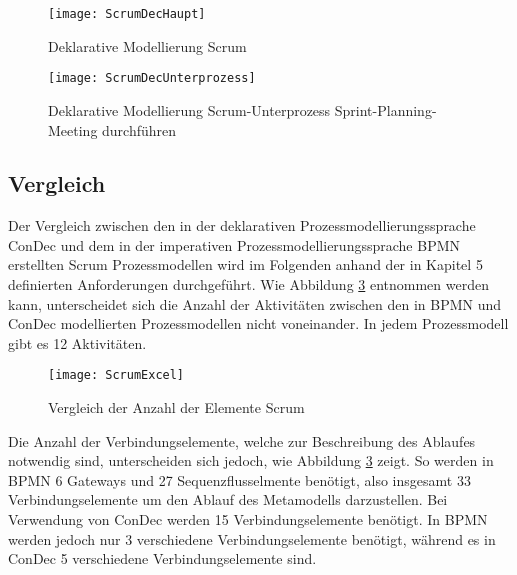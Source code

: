 \begin{figure}[htp]
\begin{center}
  \texttt{[image: ScrumDecHaupt]} %
  \caption{Deklarative Modellierung Scrum}
  \label{fig:ScrumDecHaupt}
\end{center}
\end{figure}



\begin{figure}[htp]
\begin{center}
  \texttt{[image: ScrumDecUnterprozess]} %
  \caption{Deklarative Modellierung Scrum-Unterprozess Sprint-Planning-Meeting durchführen}
  \label{fig:ScrumDecUnterprozess}
\end{center}
\end{figure}
\clearpage

\subsection{Vergleich}

Der Vergleich zwischen den in der deklarativen Prozessmodellierungssprache ConDec und dem in der imperativen Prozessmodellierungssprache BPMN erstellten Scrum Prozessmodellen wird im Folgenden anhand der in Kapitel 5 definierten Anforderungen durchgeführt. \newline
Wie Abbildung \ref{fig:ScrumExcel} entnommen werden kann, unterscheidet sich die Anzahl der Aktivitäten zwischen den in BPMN und ConDec modellierten Prozessmodellen nicht voneinander. In jedem Prozessmodell gibt es 12 Aktivitäten.\newline

\begin{figure}[htp]
\begin{center}
  \texttt{[image: ScrumExcel]} %
  \caption{Vergleich der Anzahl der Elemente Scrum}
  \label{fig:ScrumExcel}
\end{center}
\end{figure}

Die Anzahl der Verbindungselemente, welche zur Beschreibung des Ablaufes notwendig sind, unterscheiden sich jedoch, wie Abbildung \ref{fig:ScrumExcel} zeigt.\newline
So werden in BPMN 6 Gateways und 27 Sequenzflusselmente benötigt, also insgesamt 33 Verbindungselemente um den Ablauf des Metamodells darzustellen. Bei Verwendung von ConDec werden 15 Verbindungselemente benötigt. In BPMN werden jedoch nur 3 verschiedene Verbindungselemente benötigt, während es in ConDec 5 verschiedene Verbindungselemente sind.\newline



